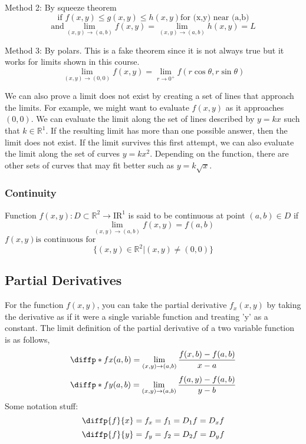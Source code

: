 \documentclass{article}
\begin{document}
Method 2: By squeeze theorem
$$\text{if }f(x,y) \leq g(x,y) \leq h(x,y) \text{for (x,y) near (a,b)}$$
$$\text{and} \lim_{(x,y)\to(a,b)}{f(x,y)} = \lim_{(x,y)\to(a,b)}{h(x,y)} = L$$

Method 3: By polars. This is a fake theorem since it is not always true but it works for limits shown in this course. 
$$\lim_{(x,y)\to(0,0)}{f(x,y)} = \lim_{r\to 0^+}{f(r\cos{\theta},r\sin{\theta})}$$

We can also prove a limit does not exist by creating a set of lines that approach the limits. For example, we might want to evaluate $f(x,y)$ as it approaches $(0,0)$. We can evaluate the limit along the set of lines described by $y=kx$ such that $k\in\mathbb{R}^1$. If the resulting limit has more than one possible answer, then the limit does not exist. If the limit survives this first attempt, we can also evaluate the limit along the set of curves $y=kx^2$. Depending on the function, there are other sets of curves that may fit better such as $y=k\sqrt{x}$. 

\subsubsection{Continuity}
Function $f(x,y): D\subset \mathbb{R}^2 \rightarrow \text{IR}^1$ is said to be continuous at point $(a,b)\in D$ if
$$\lim_{(x,y)\to(a,b)}{f(x,y)} = f(a,b)$$
$f(x,y) \text{is continuous for}$
$$\{ (x,y) \in \mathbb{R}^2 | (x,y) \neq (0,0) \}$$

\subsection{Partial Derivatives}
For the function $f(x,y)$, you can take the partial derivative $f_x(x,y)$ by taking the derivative as if it were a single variable function and treating 'y' as a constant. The limit definition of the partial derivative of a two variable function is as follows,
$$\diffp*{f}{x}{(a,b)} = \lim_{(x,y)\to(a,b)}{\frac{f(x,b) - f(a,b)}{x-a}}$$
$$\diffp*{f}{y}{(a,b)} = \lim_{(x,y)\to(a,b)}{\frac{f(a,y) - f(a,b)}{y-b}}$$
Some notation stuff:
$$\diffp{f}{x} = f_x = f_1 = D_1f = D_xf$$
$$\diffp{f}{y} = f_y = f_2 = D_2f = D_yf$$
\end{document}
